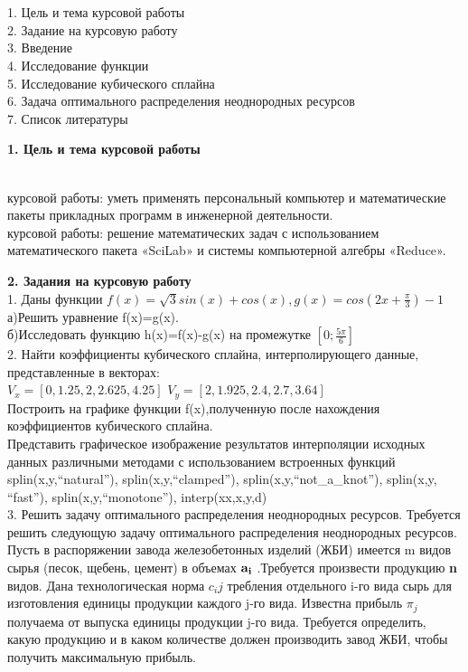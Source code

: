 \documentclass[russian,utf8,nocolumnxxxi,nocolumnxxxii]{eskdtext}
\begin{document}
\\{}
\\1. Цель и тема курсовой работы
\\2. Задание на курсовую работу
\\3. Введение
\\4. Исследование функции
\\5. Исследование кубического сплайна
\\6. Задача оптимального распределения неоднородных ресурсов
\\7. Список литературы
\newpage

 {\large\bf 1. Цель и тема курсовой работы}

\\{ курсовой работы:} уметь применять персональный компьютер и математические пакеты прикладных программ в инженерной деятельности.
\\{ курсовой работы:} решение математических задач с использованием математического пакета «SciLab» и системы компьютерной алгебры «Reduce».

\newpage
{\large\bf2. Задания на курсовую работу}
\\1. Даны функции $f(x)=\sqrt{3}sin(x)+cos(x),g(x)=cos(2x+\frac{\pi}{3})-1$
\\а)Решить уравнение f(x)=g(x).
\\б)Исследовать функцию h(x)=f(x)-g(x) на промежутке $[0;\frac{5\pi}{6}]$
\\2. Найти коэффициенты кубического сплайна, интерполирующего данные, представленные в векторах:\\
$V_{x}=[0,1.25,2,2.625,4.25]$
$V_{y}=[2,1.925,2.4,2.7,3.64]$\\
Построить на графике функции f(x),полученную после нахождения коэффициентов кубического сплайна. \\
Представить графическое изображение результатов интерполяции исходных данных различными методами с использованием встроенных функций splin(x,y,“natural”), splin(x,y,“clamped”), splin(x,y,“not\_a\_knot”), splin(x,y, “fast”), splin(x,y,“monotone”), interp(xx,x,y,d)\\
3. Решить задачу оптимального распределения неоднородных ресурсов.
Требуется решить следующую задачу оптимального распределения неоднородных ресурсов. Пусть в распоряжении завода железобетонных изделий (ЖБИ) имеется m видов сырья (песок, щебень, цемент) в объемах ${\bf a_i}$  .Требуется произвести продукцию {\bf n} видов. Дана технологическая норма $c_ij$  требления отдельного i-го вида сырь для изготовления единицы продукции каждого j-го вида. Известна прибыль $\pi_j$  получаема от выпуска единицы продукции j-го вида. Требуется определить, какую продукцию и в каком количестве должен производить завод ЖБИ, чтобы получить максимальную прибыль.
\end{document}
